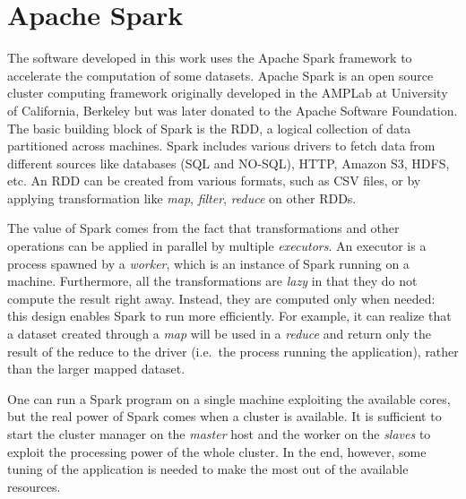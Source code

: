 %
%
\section{Apache Spark}
The software developed in this work uses the Apache Spark framework to accelerate the computation of some datasets.
Apache Spark is an open source cluster computing framework originally developed in the AMPLab at University of California, Berkeley but was later donated to the Apache Software Foundation.
The basic building block of Spark is the \ac{RDD}, a logical collection of data partitioned across machines.
Spark includes various drivers to fetch data from different sources like databases (SQL and NO-SQL), HTTP, Amazon S3, HDFS, etc.
An \acs{RDD} can be created from various formats, such as \ac{CSV} files, or by applying transformation like \emph{map}, \emph{filter}, \emph{reduce} on other \acp{RDD}.

The value of Spark comes from the fact that transformations and other operations can be applied in parallel by multiple \emph{executors}.
An executor is a process spawned by a \emph{worker}, which is an instance of Spark running on a machine.
Furthermore, all the transformations are \emph{lazy} in that they do not compute the result right away.
Instead, they are computed only when needed: this design enables Spark to run more efficiently.
For example, it can realize that a dataset created through a \emph{map} will be used in a \emph{reduce} and return only the result of the reduce to the driver (i.e.\ the process running the application), rather than the larger mapped dataset.

One can run a Spark program on a single machine exploiting the available cores, but the real power of Spark comes when a cluster is available.
It is sufficient to start the cluster manager on the \emph{master} host and the worker on the \emph{slaves} to exploit the processing power of the whole cluster.
In the end, however, some tuning of the application is needed to make the most out of the available resources.
